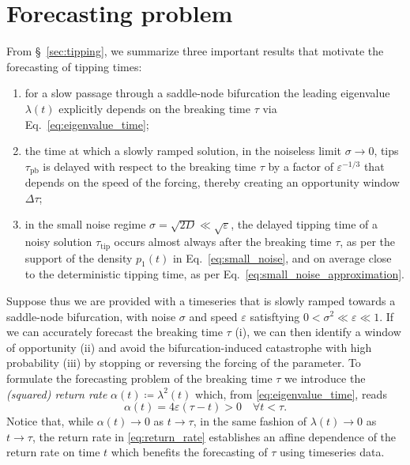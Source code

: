 \documentclass[openacc]{rsproca_new}
\begin{document}
\section{Forecasting problem}\label{sec:formulation}
From \S~\ref{sec:tipping}, we summarize three important results that motivate the forecasting of tipping times:
%
\begin{enumerate}
        \item for a slow passage through a saddle-node bifurcation the leading eigenvalue $\lambda(t)$ explicitly depends on the breaking time $\tau$ via Eq.~\eqref{eq:eigenvalue_time};
        \item the time at which a slowly ramped solution, in the noiseless limit $\sigma\to0$, tips $\tau_{\mathrm{pb}}$ is delayed with respect to the breaking time $\tau$ by a factor of $\varepsilon^{-1/3}$ that depends on the speed of the forcing, thereby creating an opportunity window $\Delta\tau$;
        \item in the small noise regime $\sigma=\sqrt{2D}\ll\sqrt{\varepsilon}$, the delayed tipping time of a noisy solution $\tau_{\mathrm{tip}}$ occurs almost always after the breaking time $\tau$, as per the support of the density $p_1(t)$ in Eq.~\eqref{eq:small_noise}, and on average close to the deterministic tipping time, as per Eq.~\eqref{eq:small_noise_approximation}.
\end{enumerate}
%
Suppose thus we are provided with a timeseries that is slowly ramped towards a saddle-node bifurcation, with noise $\sigma$ and speed $\varepsilon$ satisftying $0<\sigma^2\ll\varepsilon\ll1$. 
If we can accurately forecast the breaking time $\tau$ (i), we can then identify a window of opportunity (ii) and avoid the bifurcation-induced catastrophe with high probability (iii) by stopping or reversing the forcing of the parameter.
To formulate the forecasting problem of the breaking time $\tau$ we introduce the \emph{(squared) return rate} $\alpha(t)\coloneqq\lambda^2(t)$ which, from \eqref{eq:eigenvalue_time}, reads
%
\begin{equation}\label{eq:return_rate}
        \alpha(t) = 4\varepsilon(\tau-t)>0\quad\forall t<\tau . 
\end{equation}
%
Notice that, while $\alpha(t)\to0$ as $t\to\tau$, in the same fashion of $\lambda(t)\to0$ as $t\to\tau$, the return rate in \eqref{eq:return_rate} establishes an affine dependence of the return rate on time $t$ which benefits the forecasting of $\tau$ using timeseries data.
\end{document}
